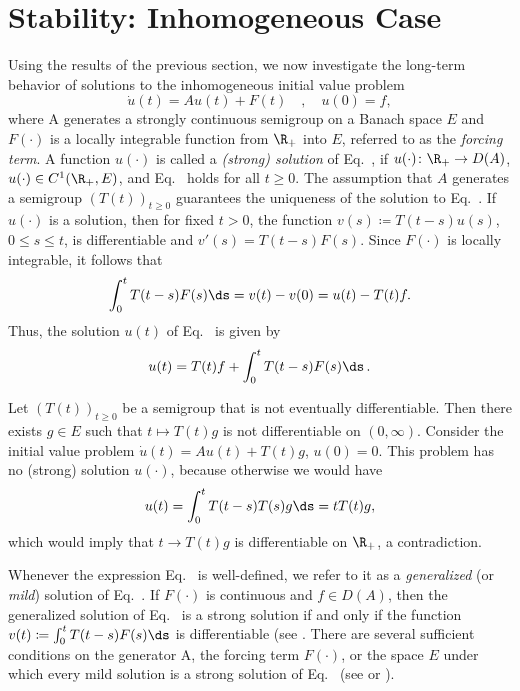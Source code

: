 \section{Stability: Inhomogeneous Case}\label{sec:a4-2}
Using the results of the previous section, we now investigate the long-term behavior of solutions to the inhomogeneous initial value
problem
\begin{equation}\label{eq:a4-2.1}
\dot{u}(t) = Au(t) + F(t) \quad , \quad u(0) = f,
\end{equation}
where A generates a strongly continuous semigroup on a
Banach space $ E $ and $F(\cdot)$ is a locally integrable function from $\R_{+}$
into $ E $, referred to as the \emph{forcing term}. 
A function $u(\cdot)$ is called a \emph{(strong) solution} of Eq.~, if\/ $u(\cdot) \colon \R_{+} \to D(A)$, 
$u(\cdot) \in C^{1}(\R_{+},E)$, and Eq.~ holds for all $t \geq 0$.
The assumption that $A$ generates a semigroup $(T(t))_{t \geq 0}$
guarantees the uniqueness of the solution to Eq.~. 
If\/ $u(\cdot)$ is a solution, then for fixed $t>0$, the function $v(s) \coloneq  T(t-s)u(s)$, $0 \leq s \leq t$, is
differentiable and $v'(s) = T(t-s)F(s)$. 
Since $F(\cdot)$ is locally integrable, it follows that 
\[
\int_{0}^{t} T(t-s)F(s)  \ds = v(t) - v(0) = u(t) - T(t)f.
\]
Thus, the solution $u(t)$ of Eq.~ is given by
\begin{equation}\label{eq:a4-2.2}
u(t) = T(t)f + \int_{0}^{t} T(t-s)F(s)  \ds\,.
\end{equation}


\begin{example*} \label{ex:a4-2.1}
Let $(T(t))_{t \geq 0}$ be a semigroup that is not eventually differentiable. 
Then there
exists $g \in E$ such that $t \mapsto T(t)g$ is not differentiable on $(0,\infty)$.
Consider the initial value problem $\dot{u}(t) = Au(t) + T(t)g$, $u(0) = 0$. This problem has no
(strong) solution $u(\cdot)$, because otherwise we would have 
\begin{align*}
u(t) = \int_{0}^{t} T(t-s)T(s)g  \ds = tT(t)g,
\end{align*}
which would imply that $t\to T(t)g$ is 
differentiable on $\R_{+}$, a contradiction. 
\end{example*}


Whenever the expression Eq.~ is well-defined, we refer to it as a  \emph{generalized} (or
\emph{mild}) solution of Eq.~. 
If\/ $F(\cdot)$ is continuous and $f \in D(A)$, then
the generalized solution of Eq.~ is a strong solution if and only if the function 
$v(t) \coloneq  \int_{0}^{t} T(t-s)F(s)  \ds$ is differentiable (see \textcite[Chapter~4,2.4]{pazy:1983}. 
There are several sufficient conditions on the generator A,
the forcing term $F(\cdot)$, or the space $E$ under which every mild solution
is a strong solution of Eq.~ (see \textcite{travis:1981}
or  \textcite[Section~4.2]{pazy:1983}).

